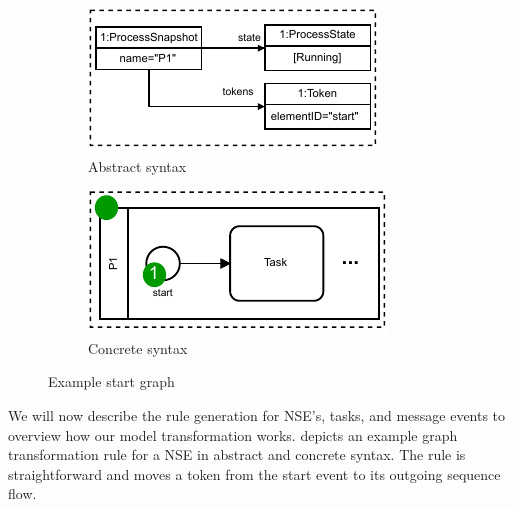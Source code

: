 \documentclass[submission, copyright, creativecommons]{eptcs}
\begin{document}
\begin{figure}
\centering
\begin{subfigure}{.35\textwidth}
  \centering
  \includegraphics[width=1\linewidth]{images/startGraph_abstract.pdf}
  \caption{Abstract syntax}
  \label{fig:startGraphAbstract}
\end{subfigure}%
\begin{subfigure}{.35\textwidth}
  \centering
  \includegraphics[width=1\linewidth]{images/startGraph_concrete.pdf}
  \caption{Concrete syntax}
  \label{fig:startGraphConcrete}
\end{subfigure}
\caption{Example start graph}
\label{fig:startGraph}
\end{figure}

We will now describe the rule generation for NSE's, tasks, and message events to overview how our model transformation works.
 depicts an example graph transformation rule for a NSE in abstract and concrete syntax.
The rule is straightforward and moves a token from the start event to its outgoing sequence flow.
\end{document}
